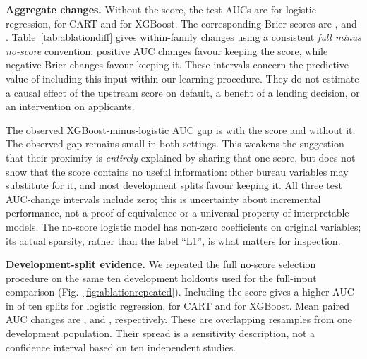 \textbf{Aggregate changes.} Without the score, the test AUCs are \NoScoreAUCLR{} for logistic regression, \NoScoreAUCCART{} for CART and \NoScoreAUCXGB{} for XGBoost. The corresponding Brier scores are \NoScoreBrierLR{}, \NoScoreBrierCART{} and \NoScoreBrierXGB{}. Table~\ref{tab:ablationdiff} gives within-family changes using a consistent \emph{full minus no-score} convention: positive AUC changes favour keeping the score, while negative Brier changes favour keeping it. These intervals concern the predictive value of including this input within our learning procedure. They do not estimate a causal effect of the upstream score on default, a benefit of a lending decision, or an intervention on applicants.

\begin{table}[htbp]
\centering\small
\caption{Paired changes from score removal, conditional on the fitted models. Differences are full minus no-score. The comparison is exploratory; no multiplicity-adjusted or equivalence claim is made.}
\label{tab:ablationdiff}

\end{table}

The observed XGBoost-minus-logistic AUC gap is \GapFullXGBLR{} with the score and \GapNoScoreXGBLR{} without it. The observed gap remains small in both settings. This weakens the suggestion that their proximity is \emph{entirely} explained by sharing that one score, but does not show that the score contains no useful information: other bureau variables may substitute for it, and most development splits favour keeping it. All three test AUC-change intervals include zero; this is uncertainty about incremental performance, not a proof of equivalence or a universal property of interpretable models. The no-score logistic model has \NoScoreLRCoef{} non-zero coefficients on \NoScoreLRVars{} original variables; its actual sparsity, rather than the label ``L1'', is what matters for inspection.

\textbf{Development-split evidence.} We repeated the full no-score selection procedure on the same ten development holdouts used for the full-input comparison (Fig.~\ref{fig:ablationrepeated}). Including the score gives a higher AUC in \RepScoreAUCPosLR{} of ten splits for logistic regression, \RepScoreAUCPosCART{} for CART and \RepScoreAUCPosXGB{} for XGBoost. Mean paired AUC changes are \RepScoreAUCMeanLR{}, \RepScoreAUCMeanCART{} and \RepScoreAUCMeanXGB{}, respectively. These are overlapping resamples from one development population. Their spread is a sensitivity description, not a confidence interval based on ten independent studies.

